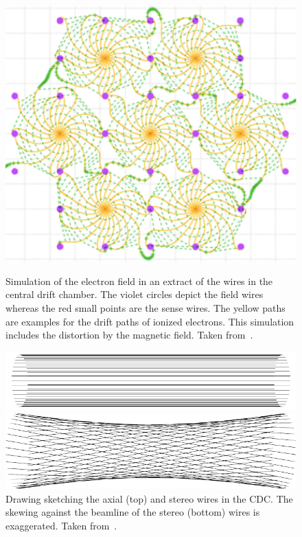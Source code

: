 \begin{figure}
  \caption[Simulation of the electron field in the central drift chamber.]{Simulation of the electron field in an extract of the wires in the central drift chamber. The violet circles depict the field wires whereas the red small points are the sense wires. The yellow paths are examples for the drift paths of ionized electrons. This simulation includes the distortion by the magnetic field. Taken from~\cite{cdc_design}.}
  \includegraphics[width=0.5\linewidth]{figures/experimental_setup/electronsInCDC.pdf}
  \label{fig-sense-wires}
\end{figure}


\begin{figure}
  \centering
  \includegraphics{figures/experimental_setup/axialLayers.pdf}
  
  \vspace*{1.5cm}
  
  \includegraphics{figures/experimental_setup/stereoLayers.pdf}
  \caption[Sketch of the axial (top) and stereo wires in the CDC.]{Drawing sketching the axial (top) and stereo wires in the CDC. The skewing against the beamline of the stereo (bottom) wires is exaggerated. Taken from~\cite{oliver}.}
  \label{fig-axial-stereo}
\end{figure}

